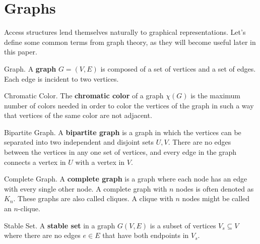 \section{Graphs}
\label{sec:graphs}

Access structures lend themselves naturally to graphical representations. Let's define some common terms from graph theory, as they will become useful later in this paper. 

\begin{definition}{Graph.}
    \label{defn:graph}
    A \textbf{graph} $G=(V,E)$ is composed of a set of vertices and a set of edges. Each edge is incident to two vertices.
\end{definition}


\begin{definition}{Chromatic Color.}
    \label{defn:colors}
	The \textbf{chromatic color} of a graph $\chi(G)$ is the maximum number of colors needed in order to color the vertices of the graph in such a way that vertices of the same color are not adjacent.
\end{definition}

\begin{definition}{Bipartite Graph.}
    \label{defn:bipartite}
	A \textbf{bipartite graph} is a graph in which the vertices can be separated into two independent and disjoint sets $U,V$. There are no edges between the vertices in any one set of vertices, and every edge in the graph connects a vertex in $U$ with a vertex in $V$.
\end{definition}

\begin{definition}{Complete Graph.}
    \label{defn:clique}
    A \textbf{complete graph} is a graph where each node has an edge with every single other node. A complete graph with $n$ nodes is often denoted as $K_n$. These graphs are also called cliques. A clique with $n$ nodes might be called an $n$-clique.
\end{definition}

\begin{definition}{Stable Set.}
    \label{defn:stable-set}
    A \textbf{stable set} in a graph $G(V,E)$ is a subset of vertices $V_s \subseteq  V$ where there are no edges $e \in E$ that have both endpoints in $V_s$.
\end{definition}

